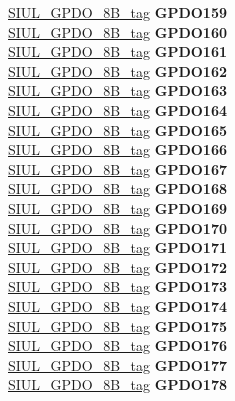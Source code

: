 \begin{DoxyCompactItemize}
\begin{tabbing}
\>\>\mbox{\hyperlink{unionSIUL__GPDO__8B__tag}{SIUL\_GPDO\_8B\_tag}} {\bfseries GPDO159}\\
\>\>\mbox{\hyperlink{unionSIUL__GPDO__8B__tag}{SIUL\_GPDO\_8B\_tag}} {\bfseries GPDO160}\\
\>\>\mbox{\hyperlink{unionSIUL__GPDO__8B__tag}{SIUL\_GPDO\_8B\_tag}} {\bfseries GPDO161}\\
\>\>\mbox{\hyperlink{unionSIUL__GPDO__8B__tag}{SIUL\_GPDO\_8B\_tag}} {\bfseries GPDO162}\\
\>\>\mbox{\hyperlink{unionSIUL__GPDO__8B__tag}{SIUL\_GPDO\_8B\_tag}} {\bfseries GPDO163}\\
\>\>\mbox{\hyperlink{unionSIUL__GPDO__8B__tag}{SIUL\_GPDO\_8B\_tag}} {\bfseries GPDO164}\\
\>\>\mbox{\hyperlink{unionSIUL__GPDO__8B__tag}{SIUL\_GPDO\_8B\_tag}} {\bfseries GPDO165}\\
\>\>\mbox{\hyperlink{unionSIUL__GPDO__8B__tag}{SIUL\_GPDO\_8B\_tag}} {\bfseries GPDO166}\\
\>\>\mbox{\hyperlink{unionSIUL__GPDO__8B__tag}{SIUL\_GPDO\_8B\_tag}} {\bfseries GPDO167}\\
\>\>\mbox{\hyperlink{unionSIUL__GPDO__8B__tag}{SIUL\_GPDO\_8B\_tag}} {\bfseries GPDO168}\\
\>\>\mbox{\hyperlink{unionSIUL__GPDO__8B__tag}{SIUL\_GPDO\_8B\_tag}} {\bfseries GPDO169}\\
\>\>\mbox{\hyperlink{unionSIUL__GPDO__8B__tag}{SIUL\_GPDO\_8B\_tag}} {\bfseries GPDO170}\\
\>\>\mbox{\hyperlink{unionSIUL__GPDO__8B__tag}{SIUL\_GPDO\_8B\_tag}} {\bfseries GPDO171}\\
\>\>\mbox{\hyperlink{unionSIUL__GPDO__8B__tag}{SIUL\_GPDO\_8B\_tag}} {\bfseries GPDO172}\\
\>\>\mbox{\hyperlink{unionSIUL__GPDO__8B__tag}{SIUL\_GPDO\_8B\_tag}} {\bfseries GPDO173}\\
\>\>\mbox{\hyperlink{unionSIUL__GPDO__8B__tag}{SIUL\_GPDO\_8B\_tag}} {\bfseries GPDO174}\\
\>\>\mbox{\hyperlink{unionSIUL__GPDO__8B__tag}{SIUL\_GPDO\_8B\_tag}} {\bfseries GPDO175}\\
\>\>\mbox{\hyperlink{unionSIUL__GPDO__8B__tag}{SIUL\_GPDO\_8B\_tag}} {\bfseries GPDO176}\\
\>\>\mbox{\hyperlink{unionSIUL__GPDO__8B__tag}{SIUL\_GPDO\_8B\_tag}} {\bfseries GPDO177}\\
\>\>\mbox{\hyperlink{unionSIUL__GPDO__8B__tag}{SIUL\_GPDO\_8B\_tag}} {\bfseries GPDO178}\\

\end{tabbing}
\end{DoxyCompactItemize}

